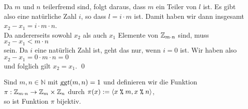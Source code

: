 \begin{enumerate}
      Da $m$ und $n$ teilerfremd sind, folgt daraus, dass $m$ ein Teiler von $l$ ist.  Es gibt also eine
      natürliche Zahl $i$, so dass $l = i \cdot m$ ist.  Damit haben wir dann insgesamt
      \\[0.2cm]
      \hspace*{1.3cm}
      $x_2 - x_1 = i \cdot m \cdot n$.
      \\[0.2cm]
      Da andererseits sowohl $x_2$ als auch $x_1$ Elemente von $\mathbb{Z}_{m \cdot n}$ sind, muss
      \\[0.2cm]
      \hspace*{1.3cm}
      $x_2 - x_1 < m \cdot n$
      \\[0.2cm]
      sein.  Da $i$ eine natürlich Zahl ist, geht das nur, wenn $i = 0$ ist.  Wir haben also
      \\[0.2cm]
      \hspace*{1.3cm}
      $x_2 - x_1 = 0 \cdot m \cdot n = 0$
      \\[0.2cm]
      und folglich gilt $x_2 = x_1$. \qed
\end{enumerate}


\begin{Korollar} \label{satz:china2} \lb
Sind $m,n \in \mathbb{N}$ mit $\textsl{ggt}(m,n) =1$ und definieren
 wir die Funktion 
\\[0.2cm]
\hspace*{1.3cm}
$\pi : \mathbb{Z}_{m \cdot n} \rightarrow \mathbb{Z}_{m} \times \mathbb{Z}_{n}$ \quad durch \quad
$\pi(x) := \langle x \;\texttt{\%}\; m, x \;\texttt{\%}\; n \rangle$,
\\[0.2cm]
so ist Funktion $\pi$ bijektiv.  
\end{Korollar}

